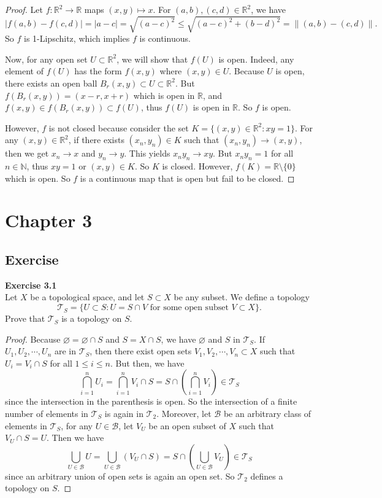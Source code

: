 \documentclass[12pt, a4paper]{article}
\theoremstyle{plain}
\newcommand{\N}{\mathbb{N}}
\newcommand{\B}{\mathscr{B}}
\newcommand{\R}{\mathbb{R}}
\newcommand{\T}{\mathcal{T}}
\newenvironment{exercise}[2][Exercise]
    { \begin{mdframed}[backgroundcolor=gray!20] \textbf{#1 #2} \\}
    {  \end{mdframed}}
\begin{document}
	\begin{proof}
	Let $f:\R^2\rightarrow \R$ maps $(x,y)\mapsto x$. For $(a,b),(c,d)\in\R^2$, we have
	\[
	|f(a,b)-f(c,d)|=|a-c|=\sqrt{(a-c)^2}\leq \sqrt{(a-c)^2+(b-d)^2}=\|(a,b)-(c,d)\|.
	\]
	So $f$ is 1-Lipschitz, which implies $f$ is continuous.
	
	Now, for any open set $U\subset \R^2$, we will show that $f(U)$ is open. Indeed, any element of $f(U)$ has the form $f(x,y)$ where $(x,y)\in U$. Because $U$ is open, there exists an open ball $B_r(x,y)\subset U\subset \R^2$. But $f(B_r(x,y))=(x-r,x+r)$ which is open in $\R$, and $f(x,y)\in f(B_r(x,y))\subset f(U)$, thus $f(U)$ is open in $\R$. So $f$ is open.
	
	However, $f$ is not closed because consider the set $K=\{(x,y)\in \R^2:xy=1\}$. For any $(x,y)\in\R^2$, if there exists $(x_n,y_n)\in K$ such that $(x_n,y_n)\rightarrow (x,y)$, then we get $x_n\rightarrow x$ and $y_n\rightarrow y$. This yields $x_ny_n\rightarrow xy$. But $x_ny_n=1$ for all $n\in\N$, thus $xy=1$ or $(x,y)\in K$. So $K$ is closed. However, $f(K)=\R\setminus\{0\}$ which is open. So $f$ is a continuous map that is open but fail to be closed.
	\end{proof}
	
\section{Chapter 3}
\subsection{Exercise}

\begin{exercise}{3.1}
Let $X$ be a topological space, and let $S\subset X$ be any subset. We define a topology 
\[
\T_S=\{U\subset S: U=S\cap V \text{ for some open subset }V\subset X\}.
\]
Prove that $\T_S$ is a topology on $S$.
\end{exercise}
	\begin{proof}
	Because $\varnothing =\varnothing\cap S$ and $S=X\cap S$, we have $\varnothing$ and $S$ in $\T_S$. If $U_1,U_2,\cdots,U_n$ are in $\T_S$, then there exist open sets $V_1,V_2,\cdots,V_n\subset X$ such that $U_i=V_i\cap S$ for all $1\leq i\leq n$. But then, we have
	\[
	\bigcap_{i=1}^n{U_i}=\bigcap_{i=1}^n{V_i\cap S}=S\cap\left(\bigcap_{i=1}^n V_i\right)\in \T_S
	\]
	since the intersection in the parenthesis is open. So the intersection of a finite number of elements in $\T_S$ is again in $\T_2$. Moreover, let $\B$ be an arbitrary class of elements in $\T_S$, for any $U\in \B$, let $V_U$ be an open subset of $X$ such that $V_U\cap S=U$. Then we have
	\[
	\bigcup_{U\in\B}{U}=\bigcup_{U\in\B}(V_U\cap S)=S\cap\left(\bigcup_{U\in\B}V_U\right)\in\T_S
	\]
	since an arbitrary union of open sets is again an open set. So $\T_2$ defines a topology on $S$.
	\end{proof}
	
\end{document}
